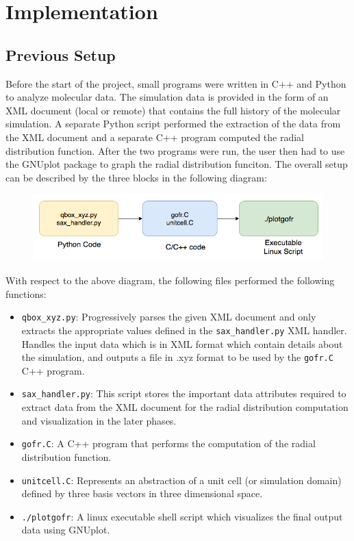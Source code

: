 \section*{Implementation}

\subsection*{Previous Setup}

Before the start of the project, small programs were written in C++ and Python to analyze molecular data. The simulation data is provided in the form of an XML document (local or remote) that contains the full history of the molecular simulation. A separate Python script performed the extraction of the data from the XML document and a separate C++ program computed the radial distribution function. After the two programs were run, the user then had to use the GNUplot package to graph the radial distribution funciton. The overall setup can be described by the three blocks in the following diagram:

\begin{figure}[h]
\centering
\includegraphics[scale=0.50]{images/old_pipeline}
\end{figure}

With respect to the above diagram, the following files performed the following functions: 

\begin{itemize}
        
    \item \verb|qbox_xyz.py|: Progressively parses the given XML document and only extracts the appropriate values defined in the \verb|sax_handler.py| XML handler. Handles the input data which is in XML format which contain details about the simulation, and outputs a file in .xyz format to be used by the \verb|gofr.C| C++ program.
    
    \item \verb|sax_handler.py|: This script stores the important data attributes required to extract data from the XML document for the radial distribution computation and visualization in the later phases.

    \item \verb|gofr.C|: A C++ program that performs the computation of the radial distribution function.
    
    \item \verb|unitcell.C|: Represents an abstraction of a unit cell (or simulation domain) defined by three basis vectors in three dimensional space.
    
    \item \verb|./plotgofr|: A linux executable shell script which visualizes the final output data using GNUplot.
    
\end{itemize}

